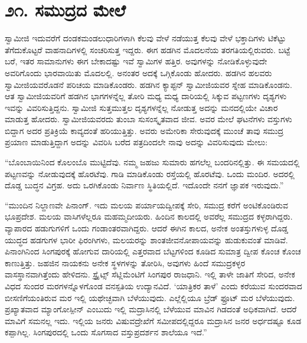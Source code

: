 
\chapter*{೨೧. ಸಮುದ್ರದ ಮೇಲೆ}

 ಸ್ವಾಮೀಜಿ ಇದುವರೆಗೆ ದಂಡಕಮಂಡಲುಧಾರಿಗಳಾಗಿ ಕೆಲವು ವೇಳೆ ನಡೆಯುತ್ತ ಕೆಲವು ವೇಳೆ ಭಕ್ತಾದಿಗಳು ಟಿಕೆಟ್ಟು ತೆಗೆದುಕೊಟ್ಟರೆ ವಾಹನಾದಿಗಳಲ್ಲಿ ಸಂಚರಿಸುತ್ತ ಇದ್ದರು. ಈಗ ಹಡಗಿನ ಮೊದಲನೆಯ ತರಗತಿಯಲ್ಲಿರುವರು. ಬಟ್ಟೆ ಬರೆ, ಇತರ ಸಾಮಾನುಗಳು ಈಗ ಬೇಕಾದಷ್ಟು ಇವೆ ಸ್ವಾಮಿಗಳ ಹತ್ತಿರ. ಅವುಗಳನ್ನು ನೋಡಿಕೊಳ್ಳುವುದೇ ಅವರಿಗೊಂದು ಭಾರವಾಯಿತು ಮೊದಲಲ್ಲಿ. ಅನಂತರ ಅದಕ್ಕೆ ಒಗ್ಗಿಕೊಂಡು ಹೋದರು. ಹಡಗಿನ ಹಲವರು ಸ್ವಾಮೀಜಿಯವರೊಡನೆ ಪರಿಚಯ ಮಾಡಿಕೊಂಡರು. ಹಡಗಿನ ಕ್ಯಾಪ್ಟನ್ ಸ್ವಾಮೀಜಿಯವರ ಸ್ನೇಹ ಮಾಡಿಕೊಂಡನು. ಆತ ಸ್ವಾಮೀಜಿಯವರಿಗೆ ಹಡಗಿನ ಭಾಗಗಳನ್ನೆಲ್ಲ ತೋರಿ ಮಧ್ಯ ಮಧ್ಯ ದಾರಿಯಲ್ಲಿ ಸಿಕ್ಕುವ ಪಟ್ಟಣಗಳು ದೃಶ್ಯಗಳು ಇವನ್ನು ವಿವರಿಸುತ್ತಿದ್ದನು. ಸ್ವಾಮೀಜಿ ಸುತ್ತಮುತ್ತಲ ದೃಶ್ಯಗಳನ್ನೆಲ್ಲ ನೋಡುತ್ತ ಅದನ್ನು ಮನದಲ್ಲಿಯೇ ವಿಚಾರ ಮಾಡುತ್ತ ಹೋದರು. ಸ್ವಾಮೀಜಿಯವರದು ತುಂಬಾ ಸುಸಂಸ್ಕೃತವಾದ ಜೀವ. ಅವರ ಮೇಲೆ ಘಟನೆಗಳು ವಸ್ತುಗಳು ಬಿದ್ದಾಗ ಅದರ ಪ್ರತಿಕ್ರಿಯೆ ಕಾವ್ಯದಂತೆ ಹರಿಯುತ್ತಿತ್ತು. ಅವರು ಅಮೇರಿಕಾ ಸೇರುವುದಕ್ಕೆ ಮುಂಚೆ ತಾವು ಸಮುದ್ರ ಪ್ರಯಾಣ ಮಾಡುತ್ತಿದ್ದಾಗ ಅದನ್ನು ವಿವರಿಸಿ ಬರೆದ ಪತ್ರದಿಂದಲೇ ನಾವು ಅದನ್ನು ವಿವರಿಸುವುದು ಮೇಲು: 

 “ಬೊಂಬಾಯಿನಿಂದ ಕೊಲಂಬೊ ಮುಟ್ಟಿದೆವು. ನಮ್ಮ ಜಹಜು ಸುಮಾರು ಹಗಲೆಲ್ಲ ಬಂದರಿನಲ್ಲಿತ್ತು. ಈ ಸಮಯದಲ್ಲಿ ಪಟ್ಟಣವನ್ನು ನೋಡುವುದಕ್ಕೆ ಹೊರಟೆವು. ಗಾಡಿ ಮಾಡಿಕೊಂಡು ರಸ್ತೆಯಲ್ಲಿ ಹೊರಟೆವು. ಒಂದು ಮಂದಿರ. ಅದರಲ್ಲಿ ದೊಡ್ಡ ಬುದ್ಧನ ವಿಗ್ರಹ. ಅದು ಒರಗಿಕೊಂಡು ನಿರ್ವಾಣ ಸ್ಥಿತಿಯಲ್ಲಿದೆ. ಇದೊಂದೇ ನನಗೆ ಜ್ಞಾಪಕ ಇರುವುದು.” 

 “ಮುಂದಿನ ನಿಲ್ದಾಣವೇ ಪಿನಾಂಗ್. ಇದು ಮಲಯ ಪರ್ಯಾಯದ್ವೀಪಕ್ಕೆ ಸೇರಿ, ಸಮುದ್ರ ಕರೆಗೆ ಅಂಟಿಕೊಂಡಿರುವ ಭೂಪ್ರದೇಶ. ಮಲಯ ವಾಸಿಗಳೆಲ್ಲರೂ ಮಹಮ್ಮದೀಯರು. ಹಿಂದಿನ ಕಾಲದಲ್ಲಿ ಅವರೆಲ್ಲ ಸಮುದ್ರದ ಕಳ್ಳರಾಗಿದ್ದರು. ವ್ಯಾಪಾರದ ಹಡುಗುಗಳಿಗೆ ಒಂದು ಗಂಡಾಂತರವಾಗಿದ್ದರು. ಆದರೆ ಈಗಿನ ಕಾಲದ, ಅನೇಕ ಅಂತಸ್ತುಗಳುಳ್ಳ ದೊಡ್ಡ ಯುದ್ಧದ ಹಡಗುಗಳ ಭಾರೀ ಫಿರಂಗಿಗಳು, ಮಲಯರನ್ನು ಶಾಂತಜೀವನೋಪಾಯವನ್ನು ಹುಡುಕುವಂತೆ ಮಾಡಿವೆ. ಪಿನಾಂಗಿನಿಂದ ಸಿಂಗಪುರಕ್ಕೆ ಹೋಗುವ ದಾರಿಯಲ್ಲಿ ಎತ್ತರವಾದ ಬೆಟ್ಟಗಳಿಂದ ಕೂಡಿದ ಸುಮಾತ್ರ ದ್ವೀಪ ಕೊಂಚ ಕೊಂಚ ಕಾಣುತ್ತಿತ್ತು. ಜಹಜಿನ ನಾಯಕನು ಅನೇಕ ಸ್ಥಳಗಳನ್ನು ತೋರಿಸಿ, ಅವುಗಳು ಹಿಂದೆ ಸಮುದ್ರಕಳ್ಳರ ವಾಸಸ್ಥಾನವಾಗಿತ್ತೆಂದು ಹೇಳಿದನು. ಸ್ಟ್ರೈಟ್ಸ್ ಸೆಟ್ಲಿಮೆಂಟಿಗೆ ಸಿಂಗಪುರ ರಾಜಧಾನಿ. ಇಲ್ಲಿ ತಾಳೇ ಜಾತಿಗೆ ಸೇರಿದ, ಅನೇಕ ವಿಧದ ಸುಂದರ ಮರಗಳನ್ನೊಳಗೊಂಡ ವನಸ್ಪತಿಯ ಉದ್ಯಾನವಿದೆ. ‘ಯಾತ್ರಿಕರ ತಾಳೆ’ ಎಂದು ಕರೆಯುವ ಸುಂದರವಾದ ಬೀಸಣಿಗೆಯಂತಿರುವ ಮರ ಇಲ್ಲಿ ಯಥೇಚ್ಛವಾಗಿ ಬೆಳೆಯುವುದು. ಎಲ್ಲೆಲ್ಲಿಯೂ ಬ್ರೆಡ್ ಫ್ರೂಟ್ ಮರ ಬೆಳೆಯುವುದು. ಪ್ರಖ್ಯಾತವಾದ ಮ್ಯಾಂಗೋಸ್ಪೀನ್ ಎಂಬುದು ಇಲ್ಲಿ ಮದ್ರಾಸಿನಲ್ಲಿ ಬೆಳೆಯುವ ಮಾವಿನ ಗಿಡದಂತೆ ಅಧಿಕವಾಗಿದೆ. ಆದರೆ ಮಾವಿಗೆ ಸಮನಲ್ಲ ಇದು. ಇಲ್ಲಿಯ ಜನರು ವಿಷುವದ್ರೇಖೆಗೆ ಸಮೀಪದಲ್ಲಿದ್ದರೂ ಮದ್ರಾಸಿನ ಜನರ ಅರ್ಧದಷ್ಟೂ ಕೂಡ ಕಪ್ಪಾಗಿಲ್ಲ. ಸಿಂಗಪುರದಲ್ಲಿ ಒಂದು ಸೊಗಸಾದ ವಸ್ತುಪ್ರದರ್ಶನ ಶಾಲೆಯೂ ಇದೆ.” 

